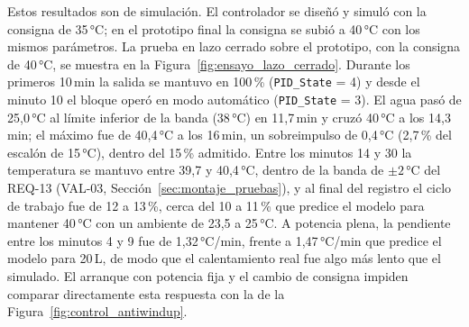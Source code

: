 Estos resultados son de simulación. El controlador se diseñó y simuló con la consigna de 35\,°C; en el prototipo final la consigna se subió a 40\,°C con los mismos parámetros. La prueba en lazo cerrado sobre el prototipo, con la consigna de 40\,°C, se muestra en la Figura~\ref{fig:ensayo_lazo_cerrado}. Durante los primeros 10\,min la salida se mantuvo en 100\,\% (\texttt{PID\_State} = 4) y desde el minuto 10 el bloque operó en modo automático (\texttt{PID\_State} = 3). El agua pasó de 25,0\,°C al límite inferior de la banda (38\,°C) en 11,7\,min y cruzó 40\,°C a los 14,3\,min; el máximo fue de 40,4\,°C a los 16\,min, un sobreimpulso de 0,4\,°C (2,7\,\% del escalón de 15\,°C), dentro del 15\,\% admitido. Entre los minutos 14 y 30 la temperatura se mantuvo entre 39,7 y 40,4\,°C, dentro de la banda de $\pm 2$\,°C del REQ-13 (VAL-03, Sección~\ref{sec:montaje_pruebas}), y al final del registro el ciclo de trabajo fue de 12 a 13\,\%, cerca del 10 a 11\,\% que predice el modelo para mantener 40\,°C con un ambiente de 23,5 a 25\,°C. A potencia plena, la pendiente entre los minutos 4 y 9 fue de 1,32\,°C/min, frente a 1,47\,°C/min que predice el modelo para 20\,L, de modo que el calentamiento real fue algo más lento que el simulado. El arranque con potencia fija y el cambio de consigna impiden comparar directamente esta respuesta con la de la Figura~\ref{fig:control_antiwindup}.

